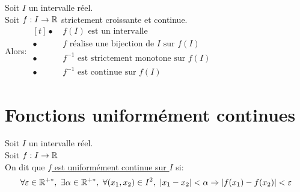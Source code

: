 \documentclass[12pt,twoside,a4paper]{article}
\begin{document}
		\begin{coro}
			Soit $I$ un intervalle r\'eel.\\
			Soit $f:I\rightarrow\mathbb{R}$ strictement croissante et continue.\\
			Alors: $\begin{aligned}[t]
			\bullet \ & f(I)\text{ est un intervalle}\\
			\bullet \ & f \text{ r\'ealise une bijection de }I\text{ sur }f(I)\\
			\bullet \ & f^{-1}\text{ est strictement monotone sur }f(I)\\
			\bullet \ & f^{-1}\text{ est continue sur }f(I)
			\end{aligned}$
		\end{coro}
	\section{Fonctions uniform\'ement continues}
		\begin{defi}
			Soit $I$ un intervalle r\'eel.\\
			Soit $f:I\rightarrow\mathbb{R}$\\
			On dit que \underline{$f$ est uniform\'ement continue sur $I$} si:
			$$\forall\varepsilon\in\R^{+*},\ \exists\alpha\in\R^{+*},\ \forall(x_1,x_2)\in I^{2},\ |x_1-x_2|<\alpha\Rightarrow |f(x_1)-f(x_2)|<\varepsilon$$
		\end{defi}
\end{document}
